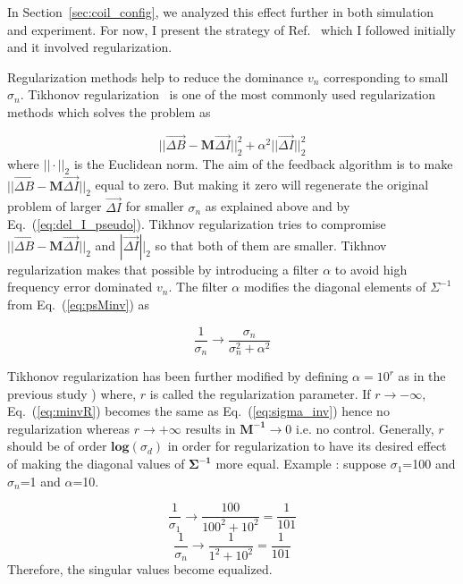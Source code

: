 In Section~\ref{sec:coil_config}, we analyzed this effect further in both simulation and experiment. For now, I present the strategy of Ref.~\cite{bea} which I followed initially and it involved regularization.

Regularization methods help to reduce the dominance $v_n$ corresponding to small $\sigma_n$. Tikhonov regularization~\cite{tikhonov2013numerical,tikhonov_book,svd,svd3} is one of the most commonly used regularization methods which solves the problem as 

\begin{equation}\label{eq:tikhonov}
    ||\Vec{\Delta B}-\bm{M}\Vec{\Delta I}||_2^2+{\alpha}^2||\Vec{\Delta I}||_2^2
\end{equation}
where $||\cdot ||_2$ is the Euclidean norm. The aim of the feedback algorithm is to make $||\Vec{\Delta B}-\bm{M}\Vec{\Delta I}||_2$ equal to zero. But making it zero will regenerate the original problem of larger $\Vec{\Delta I}$ for smaller $\sigma_n$ as explained above and by Eq.~(\ref{eq:del_I_pseudo}). Tikhnov regularization tries to compromise $||\Vec{\Delta B}-\bm{M}\Vec{\Delta I}||_2$ and $|\Vec{\Delta I}||_2$ so that both of them are smaller. Tikhnov regularization makes that possible by introducing a filter $\alpha$ to avoid high frequency error dominated $v_n$. The filter $\alpha$ modifies the diagonal elements of $\Sigma^{-1}$ from Eq.~(\ref{eq:psMinv}) as

\begin{equation}\label{eq:minvR}
    \frac{1}{\sigma_n} \rightarrow \frac{\sigma_n}{\sigma_n^2+\alpha^2} 
\end{equation}

Tikhonov regularization has been further modified by defining $\alpha=10^r$ as in the previous study \cite{bea}) where, $r$ is called the regularization parameter. If  $r \rightarrow - \infty$, Eq.~(\ref{eq:minvR}) becomes the same as Eq.~(\ref{eq:sigma_inv}) hence no regularization whereas $r \rightarrow + \infty$ results in $\bm{M^{-1}} \rightarrow 0$ i.e. no control. Generally, $r$ should be of order $\mathbf{log}(\sigma_{d})$ in order for regularization to have its desired effect of making the diagonal values of $\bm{\Sigma^{-1}}$ more equal. Example : suppose $\sigma_1$=100 and $\sigma_n$=1 and $\alpha$=10.

\begin{equation*}
    \frac{1}{\sigma_1} \rightarrow \frac{100}{100^2+10^2}=\frac{1}{101} 
\end{equation*}
\begin{equation*}
    \frac{1}{\sigma_n} \rightarrow \frac{1}{1^2+10^2}=\frac{1}{101} 
\end{equation*}
Therefore, the singular values become equalized.

